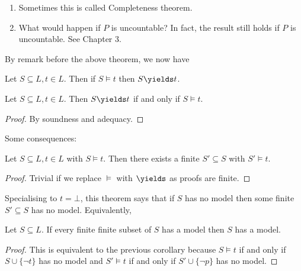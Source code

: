 \documentclass[a4paper]{article}
\begin{document}
\begin{remark}\leavevmode
  \begin{enumerate}
  \item Sometimes this is called Completeness theorem.
  \item What would happen if \(P\) is uncountable? In fact, the result still holds if \(P\) is uncountable. See Chapter 3.
  \end{enumerate}
\end{remark}

By remark before the above theorem, we now have

\begin{corollary}[Adequacy]
  Let \(S \subseteq L, t \in L\). Then if \(S \models t\) then \(S \yields t\).
\end{corollary}

\begin{theorem}
  Let \(S \subseteq L, t \in L\). Then \(S \yields t\) if and only if \(S \models t\).
\end{theorem}

\begin{proof}
  By soundness and adequacy.
\end{proof}

Some consequences:

\begin{corollary}
  Let \(S \subseteq L, t \in L\) with \(S \models t\). Then there exists a finite \(S' \subseteq S\) with \(S' \models t\).
\end{corollary}

\begin{proof}
  Trivial if we replace \(\models\) with \(\yields\) as proofs are finite.
\end{proof}

Specialising to \(t = \bot\), this theorem says that if \(S\) has no model then some finite \(S' \subseteq S\) has no model. Equivalently,

\begin{corollary}
  Let \(S \subseteq L\). If every finite finite subset of \(S\) has a model then \(S\) has a model.
\end{corollary}

\begin{proof}
  This is equivalent to the previous corollary because \(S \models t\) if and only if \(S \cup \{\neg t\}\) has no model and \(S' \models t\) if and only if \(S' \cup \{\neg p\}\) has no model.
\end{proof}
\end{document}
